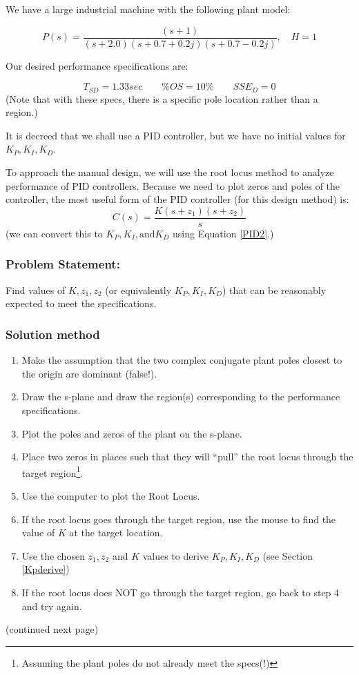 \begin{Example}
We have a large industrial machine with the following plant model:

\[
P(s) = \frac {(s+1)} {(s+2.0)(s+0.7+0.2j)(s+0.7-0.2j)}, \quad H=1
\]


Our desired performance specifications are:

\[
T_{SD} = 1.33 sec  \qquad
\%OS = 10\%        \qquad
SSE_D = 0
\]
(Note that with these specs, there is a specific pole location rather than a region.)

It is decreed that we shall use a PID controller, but we have no initial values for $K_P, K_I, K_D$.

To approach the manual design, we will use the root locus method to analyze performance of PID controllers.  Because we need to plot zeros and poles of the controller,  the most useful form of the PID controller (for this design method) is:
\[
C(s) = \frac{K(s+z_1)(s+z_2)}{s}
\]
(we can convert this to $K_P, K_I, \mathrm{and} K_D$ using Equation \ref{PID2}.)

\subsubsection*{Problem Statement: }  Find values of $K, z_1, z_2$ (or equivalently $K_P, K_I, K_D$) that can be reasonably expected to meet the specifications.

\subsubsection*{Solution method}
\begin{enumerate}
 \item Make the assumption that the two complex conjugate plant poles closest to the origin are dominant (false!).
 \item Draw the s-plane and draw the region(s) corresponding to the performance specifications.
 \item Plot the poles and zeros of the plant on the s-plane.
 \item Place two zeros in places such that they will ``pull'' the root locus through the target region\footnote{Assuming the plant poles do not already meet the specs(!)}.

  \item Use the computer to plot the Root Locus.
  \item If the root locus goes through the target region, use the mouse to find the value of $K$ at the target location.
  \item Use the chosen $z_1, z_2$ and $K$ values to derive  $K_P, K_I, K_D$ (see Section \ref{Kpderive})
  \item If the root locus does NOT go through the target region, go back to step 4 and try again.
\end{enumerate}
%
(continued next page)
\end{Example}
%


